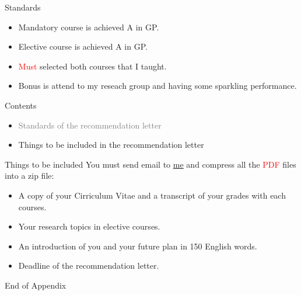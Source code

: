 \documentclass{beamer}
\begin{document}
\begin{frame}{Standards}
\begin{itemize}
\item Mandatory course is achieved A in GP.
\item Elective course is achieved A in GP.
\item \textcolor{red}{Must} selected both courses that I taught.
\item Bonus is attend to my reseach group and having some sparkling performance.
\end{itemize}
\end{frame}
\begin{frame}{Contents}
\begin{itemize}
\item \textcolor{gray}{Standards of the recommendation letter}
\item Things to be included in the recommendation letter
\end{itemize}
\end{frame}
\begin{frame}{Things to be included}
You must send email to \href{mailto:politics-tchsiao@gmail.com}{me} and compress all the \textcolor{red}{PDF} files into a zip file:
\begin{itemize}
\item A copy of your Cirriculum Vitae and a transcript of your grades with each courses.
\item Your research topics in elective courses.
\item An introduction of you and your future plan in 150 English words.
\item Deadline of the recommendation letter.
\end{itemize}
\end{frame}
\begin{frame}{}
\begin{center}
\Large{End of Appendix}
\end{center}
\end{frame}
\end{document}
